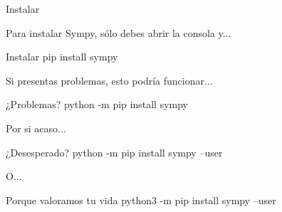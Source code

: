 \begin{frame}[t]{Instalar}\vspace{0pt}

Para instalar Sympy, s\'olo debes abrir la consola y...

\begin{block}{Instalar}
	pip install sympy
\end{block}

Si presentas problemas, esto podría funcionar...

\begin{block}{¿Problemas?}
	python -m pip install sympy
\end{block}

Por si acaso...

\begin{block}{¿Desesperado?}
	python -m pip install sympy --user
\end{block}

O...

\begin{block}{Porque valoramos tu vida}
	python3 -m pip install sympy --user
\end{block}



\end{frame}